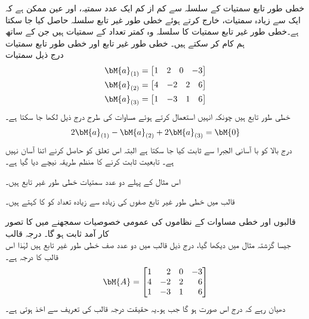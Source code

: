 خطی طور تابع سمتیات کے سلسلہ سے کم از کم ایک عدد سمتیہ، اور عین ممکن ہے کہ ایک سے زیادہ سمتیات، خارج کرتے ہوئے خطی طور غیر تابع سلسلہ حاصل کیا جا سکتا ہے۔خطی طور غیر تابع سمتیات کا سلسلہ وہ کمتر تعداد کے سمتیات ہیں جن کے ساتھ ہم کام کر سکتے ہیں۔
\quad خطی طور غیر تابع اور خطی طور تابع سمتیات\\
درج ذیل سمتیات 
\begin{align*}
\bM{a}_{(1)}&=\begin{bmatrix*}[r] 1&2&0&-3  \end{bmatrix*}\\
\bM{a}_{(2)}&=\begin{bmatrix*}[r] 4&-2&2&6  \end{bmatrix*}\\
\bM{a}_{(3)}&=\begin{bmatrix*}[r] 1&-3&1&6  \end{bmatrix*}
\end{align*}
خطی طور تابع ہیں چونکہ انہیں استعمال کرتے ہوئے مساوات  کی طرح  درج ذیل لکھا جا سکتا ہے۔
\begin{align*}
2\bM{a}_{(1)}-\bM{a}_{(2)}+2\bM{a}_{(3)}=\bM{0}
\end{align*}
درج بالا کو با آسانی الجبرا سے ثابت کیا جا سکتا ہے البتہ اس تعلق کو حاصل کرنے اتنا آسان نہیں ہے۔ تابعیت ثابت کرنے کا منظم طریقہ نیچے دیا گیا ہے۔ 

اس مثال کے پہلے دو عدد سمتیات خطی طور غیر تابع ہیں۔

قالب  میں خطی طور غیر تابع صفوں کی زیادہ سے زیادہ تعداد  کو  کا  کہتے ہیں۔ 

قالبوں  اور خطی مساوات کے نظاموں کی عمومی خصوصیات سمجھنے  میں  کا تصور  کار آمد ثابت ہو گا۔ 
\quad درجہ قالب\\
جیسا گزشتہ مثال میں دیکھا گیا، درج ذیل قالب میں دو عدد صف خطی طور غیر تابع ہیں لہٰذا اس قالب  کا درجہ  ہے۔
\begin{align*}
\bM{A}=\begin{bmatrix*}[r] 1&2&0&-3\\4&-2&2&6\\1&-3&1&6 \end{bmatrix*}
\end{align*}
دھیان رہے کہ درج  اس صورت  ہو گا جب  ہو۔یہ حقیقت درجہ قالب کی تعریف سے اخذ ہوتی ہے۔ 


